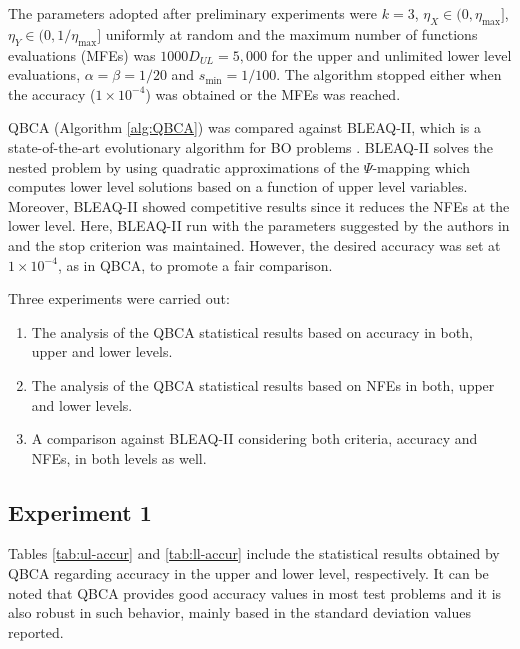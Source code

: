 \documentclass[conference]{IEEEtran}
\theoremstyle{definition}
\begin{document}
The parameters adopted after preliminary
experiments were $k = 3$, $\eta_{X} \in (0, \eta_{\max}]$, $\eta_{Y} \in (0, 1/\eta_{\max}]$
uniformly at random and the maximum number of functions evaluations (MFEs) was
$1000D_{UL}=5,000$ for the upper and unlimited lower level evaluations,
$\alpha = \beta = 1 / 20$ and $s_{\min} = 1/100$. The  algorithm stopped either
when the accuracy ($1\times 10^{-4}$) was obtained or the MFEs was reached.


QBCA (Algorithm \ref{alg:QBCA}) was compared against BLEAQ-II, which is a state-of-the-art
evolutionary algorithm for BO problems \cite{sinha2018review,sinha2013efficient}.
BLEAQ-II solves the nested problem by using quadratic approximations of the
$\Psi$-mapping which computes lower level solutions based on a function of upper
level variables. Moreover, BLEAQ-II showed competitive results since it reduces
the NFEs at the lower level. Here, BLEAQ-II run with the parameters suggested by
the authors in \cite{sinha2018review,sinha2017bilevel} and the stop criterion was
maintained.  However, the desired accuracy was set at $1\times 10^{-4}$, as in
QBCA, to promote a fair comparison.

Three experiments were carried out:
% 
\begin{enumerate}
    \item The analysis of the QBCA statistical results based on accuracy in both,
          upper and lower levels.
    \item The analysis of the QBCA statistical results based on NFEs in both,
          upper and lower levels. 
    \item A comparison against BLEAQ-II considering both criteria, accuracy and
          NFEs, in both levels as well.
\end{enumerate}
% 


\subsection{Experiment 1}
Tables \ref{tab:ul-accur} and \ref{tab:ll-accur} include the statistical results
obtained by QBCA regarding accuracy in the upper and lower level, respectively.
It can be noted that QBCA provides good accuracy values in most test problems
and it is also robust in such behavior, mainly based in the standard deviation
values reported. 
\end{document}

